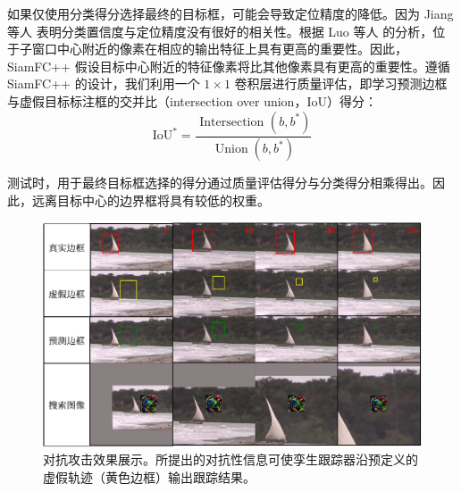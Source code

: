 如果仅使用分类得分选择最终的目标框，可能会导致定位精度的降低。因为 Jiang 等人 \cite{IoU-Net} 表明分类置信度与定位精度没有很好的相关性。根据 Luo 等人 \cite{ERF} 的分析，位于子窗口中心附近的像素在相应的输出特征上具有更高的重要性。因此，SiamFC++ 假设目标中心附近的特征像素将比其他像素具有更高的重要性。遵循 SiamFC++ 的设计，我们利用一个 $1 \times 1$ 卷积层进行质量评估，即学习预测边框与虚假目标标注框的交并比（intersection over union，IoU）得分：
\begin{equation}
\mathrm{IoU}^{*}=\frac{\text { Intersection }\left(b, b^{*}\right)}{\operatorname{Union}\left(b, b^{*}\right)}
\end{equation}

测试时，用于最终目标框选择的得分通过质量评估得分与分类得分相乘得出。因此，远离目标中心的边界框将具有较低的权重。

\begin{figure}[t]
\centering
\includegraphics[width=1.0\textwidth]{Img/attack/vis_v4.pdf}
\caption{对抗攻击效果展示。所提出的对抗性信息可使孪生跟踪器沿预定义的虚假轨迹（黄色边框）输出跟踪结果。}
\label{fig:attack_vis}
\end{figure}

